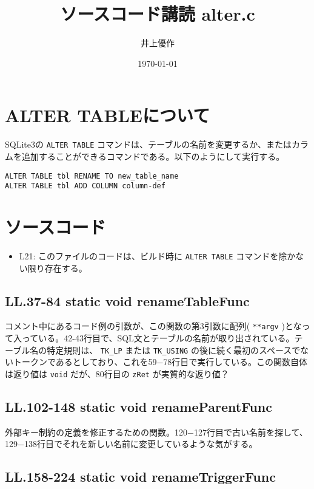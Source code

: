 \documentclass{ltjsarticle}
\author{井上優作}
\date{\today}
\title{ソースコード講読 alter.c}
\begin{document}
\maketitle

\section*{ALTER TABLEについて}
\label{sec-1}

SQLite3の \verb~ALTER TABLE~ コマンドは、テーブルの名前を変更するか、またはカラムを追加することができるコマンドである。以下のようにして実行する。

\begin{verbatim}
ALTER TABLE tbl RENAME TO new_table_name
ALTER TABLE tbl ADD COLUMN column-def
\end{verbatim}

\section*{ソースコード}
\label{sec-2}

\begin{itemize}
\item L21: このファイルのコードは、ビルド時に \verb~ALTER TABLE~ コマンドを除かない限り存在する。
\end{itemize}

\subsection*{LL.37-84 static void renameTableFunc}
\label{sec-2-1}

コメント中にあるコード例の引数が、この関数の第3引数に配列( \verb~**argv~ )となって入っている。42-43行目で、SQL文とテーブルの名前が取り出されている。テーブル名の特定規則は、 \verb~TK_LP~ または \verb~TK_USING~ の後に続く最初のスペースでないトークンであるとしており、これを59−78行目で実行している。この関数自体は返り値は \verb~void~ だが、80行目の \verb~zRet~ が実質的な返り値？　

\subsection*{LL.102-148 static void renameParentFunc}
\label{sec-2-2}

外部キー制約の定義を修正するための関数。120−127行目で古い名前を探して、129−138行目でそれを新しい名前に変更しているような気がする。

\subsection*{LL.158-224 static void renameTriggerFunc}
\label{sec-2-3}
\end{document}
